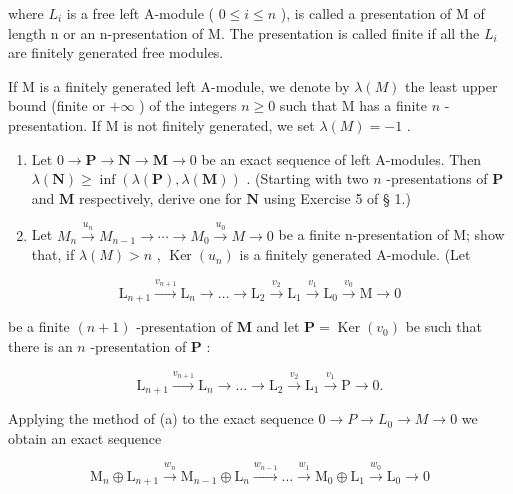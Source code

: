 where \(L_{i}\) is a free left A-module ( \(0 \leqslant i \leqslant n\) ), is called a presentation of M of length n or an n-presentation of M. The presentation is called finite if all the \(L_{i}\) are finitely generated free modules.

If M is a finitely generated left A-module, we denote by \(\lambda(M)\) the least upper bound (finite or \(+\infty\) ) of the integers \(n \geqslant 0\) such that M has a finite \(n\) -presentation. If M is not finitely generated, we set \(\lambda(M) = -1\) .

\begin{enumerate}
\def\labelenumi{(\alph{enumi})}
\item
  Let \(0 \to \mathbf{P} \to \mathbf{N} \to \mathbf{M} \to 0\) be an exact sequence of left A-modules. Then \(\lambda(\mathbf{N}) \geqslant \inf(\lambda(\mathbf{P}), \lambda(\mathbf{M}))\) . (Starting with two \(n\) -presentations of \(\mathbf{P}\) and \(\mathbf{M}\) respectively, derive one for \(\mathbf{N}\) using Exercise 5 of § 1.)
\item
  Let \(M_{n} \xrightarrow{u_{n}} M_{n-1} \rightarrow \cdots \rightarrow M_{0} \xrightarrow{u_{0}} M \rightarrow 0\) be a finite n-presentation of M; show that, if \(\lambda(M) > n\) , \(\operatorname{Ker}(u_{n})\) is a finitely generated A-module. (Let
\end{enumerate}

\[
\mathrm{L} _ {n + 1} \xrightarrow {v _ {n + 1}} \mathrm{L} _ {n} \longrightarrow \dots \longrightarrow \mathrm{L} _ {2} \xrightarrow {v _ {2}} \mathrm{L} _ {1} \xrightarrow {v _ {1}} \mathrm{L} _ {0} \xrightarrow {v _ {0}} \mathrm{M} \longrightarrow 0
\]

be a finite \((n + 1)\) -presentation of \(\mathbf{M}\) and let \(\mathbf{P} = \operatorname{Ker}(v_0)\) be such that there is an \(n\) -presentation of \(\mathbf{P}\) :

\[
\mathrm{L} _ {n + 1} \xrightarrow {v _ {n + 1}} \mathrm{L} _ {n} \longrightarrow \dots \longrightarrow \mathrm{L} _ {2} \xrightarrow {v _ {2}} \mathrm{L} _ {1} \xrightarrow {v _ {1}} \mathrm{P} \longrightarrow 0.
\]

Applying the method of (a) to the exact sequence \(0 \rightarrow P \rightarrow L_{0} \rightarrow M \rightarrow 0\) we obtain an exact sequence

\[
\mathrm{M} _ {n} \oplus \mathrm{L} _ {n + 1} \xrightarrow {w _ {n}} \mathrm{M} _ {n - 1} \oplus \mathrm{L} _ {n} \xrightarrow {w _ {n - 1}} \dots \xrightarrow {w _ {1}} \mathrm{M} _ {0} \oplus \mathrm{L} _ {1} \xrightarrow {w _ {0}} \mathrm{L} _ {0} \longrightarrow 0
\]

